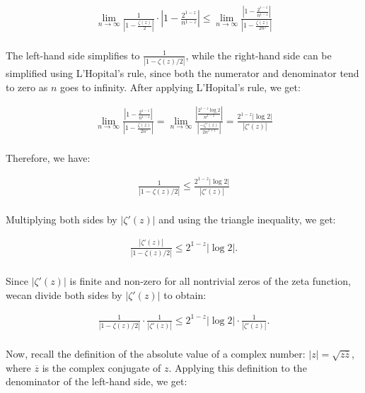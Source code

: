 \documentclass{article}
\begin{document}
\begin{align*}
\lim_{n \to \infty} \frac{1}{\left|1 - \frac{\zeta(z)}{2}\right|} \cdot \left|1 - \frac{2^{1-z}}{n^{1-z}}\right| \leq \lim_{n \to \infty} \frac{\left|1 - \frac{2^{1-z}}{n^{1-z}}\right|}{\left|1 - \frac{\zeta(z)}{2n^{z}}\right|} \\
\end{align*}

The left-hand side simplifies to $\frac{1}{|1 - \zeta(z)/2|}$, while the right-hand side can be simplified using L'Hopital's rule, since both the numerator and denominator tend to zero as $n$ goes to infinity. After applying L'Hopital's rule, we get:

\begin{align*}
\lim_{n \to \infty} \frac{\left|1 - \frac{2^{1-z}}{n^{1-z}}\right|}{\left|1 - \frac{\zeta(z)}{2n^{z}}\right|} = \lim_{n \to \infty} \frac{\left|\frac{2^{1-z}\log 2}{n^{2-z}}\right|}{\left|\frac{-\zeta'(z)}{2n^{z+1}}\right|} = \frac{2^{1-z}|\log 2|}{|\zeta'(z)|} \\
\end{align*}

Therefore, we have:

\begin{align*}
\frac{1}{|1 - \zeta(z)/2|} \leq \frac{2^{1-z}|\log 2|}{|\zeta'(z)|} \\
\end{align*}

Multiplying both sides by $|\zeta'(z)|$ and using the triangle inequality, we get:

\begin{align*}
\frac{|\zeta'(z)|}{|1 - \zeta(z)/2|} \leq 2^{1-z}|\log 2|. \\
\end{align*}

Since $|\zeta'(z)|$ is finite and non-zero for all nontrivial zeros of the zeta function, wecan divide both sides by $|\zeta'(z)|$ to obtain:

\begin{align*}
\frac{1}{|1 - \zeta(z)/2|} \cdot \frac{1}{|\zeta'(z)|} \leq 2^{1-z}|\log 2| \cdot \frac{1}{|\zeta'(z)|}. \\
\end{align*}

Now, recall the definition of the absolute value of a complex number: $|z| = \sqrt{z \overline{z}}$, where $\overline{z}$ is the complex conjugate of $z$. Applying this definition to the denominator of the left-hand side, we get:
\end{document}
